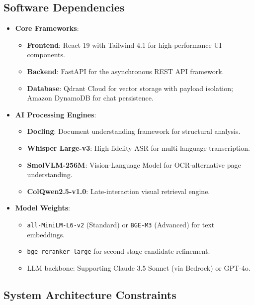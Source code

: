 \subsection{Software Dependencies}

\begin{itemize}
    \item \textbf{Core Frameworks}:
    \begin{itemize}
        \item \textbf{Frontend}: React 19 with Tailwind 4.1 for high-performance UI components.
        \item \textbf{Backend}: FastAPI for the asynchronous REST API framework.
        \item \textbf{Database}: Qdrant Cloud for vector storage with payload isolation; Amazon DynamoDB for chat persistence.
    \end{itemize}
    \item \textbf{AI Processing Engines}:
    \begin{itemize}
        \item \textbf{Docling}: Document understanding framework for structural analysis.
        \item \textbf{Whisper Large-v3}: High-fidelity ASR for multi-language transcription.
        \item \textbf{SmolVLM-256M}: Vision-Language Model for OCR-alternative page understanding.
        \item \textbf{ColQwen2.5-v1.0}: Late-interaction visual retrieval engine.
    \end{itemize}
    \item \textbf{Model Weights}:
    \begin{itemize}
        \item \texttt{all-MiniLM-L6-v2} (Standard) or \texttt{BGE-M3} (Advanced) for text embeddings.
        \item \texttt{bge-reranker-large} for second-stage candidate refinement.
        \item LLM backbone: Supporting Claude 3.5 Sonnet (via Bedrock) or GPT-4o.
    \end{itemize}
\end{itemize}

\subsection{System Architecture Constraints}

